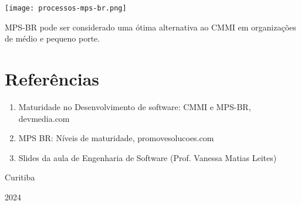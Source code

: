 \documentclass{article}
\begin{document}
\begin{center}
    \texttt{[image: processos-mps-br.png]}
\end{center}

\vspace*{0.5cm}
MPS-BR pode ser considerado uma ótima alternativa ao CMMI
em organizações de médio e pequeno porte.

\section{Referências}
\begin{enumerate}
    \item Maturidade no Desenvolvimento de software: CMMI e MPS-BR, devmedia.com
    \item MPS BR: Níveis de maturidade, promovesolucoes.com
    \item Slides da aula de Engenharia de Software (Prof. Vanessa Matias Leites)
\end{enumerate}

\vfill
\begin{center}
    Curitiba

    2024
\end{center}
\end{document}
